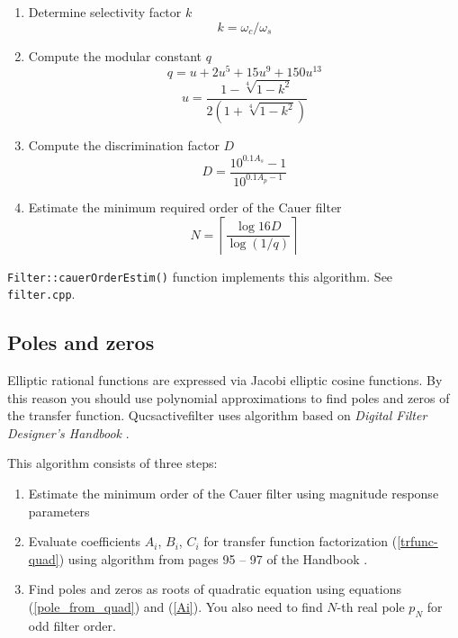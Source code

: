 \begin{enumerate}
 \item Determine selectivity factor $k$
 \begin{equation}
  k = \omega_c/\omega_s \label{k_cauer}
 \end{equation}
 \item Compute the modular constant $q$
 \begin{equation}
  q = u +2u^5+15u^9+150u^{13} \label{q_cauer}
 \end{equation}
 \begin{equation}
  u = \frac{1-\sqrt[4]{1-k^2}}{2(1+\sqrt[4]{1-k^2})}
 \end{equation}
\item Compute the discrimination factor $D$
\begin{equation}
 D = \frac{10^{0.1A_s}-1}{10^{0.1A_p-1}}
\end{equation}
\item Estimate the minimum required order of the Cauer filter
\begin{equation}
 N = \left\lceil\frac{\log 16D}{\log(1/q)}\right\rceil \label{cauer-order}
\end{equation}

\end{enumerate}

\verb|Filter::cauerOrderEstim()| function implements this algorithm. See
\verb|filter.cpp|.

\subsection{Poles and zeros}

Elliptic rational functions are expressed via Jacobi elliptic cosine functions.
By this reason you should use polynomial approximations to find poles and zeros
of the transfer function. Qucsactivefilter uses algorithm based on 
\emph{Digital Filter Designer's Handbook} \cite{dfd_handbook}.

This algorithm consists of three steps:
\begin{enumerate}
 \item Estimate the minimum order of the Cauer filter using magnitude
response parameters
 \item Evaluate coefficients $A_i$, $B_i$, $C_i$ for transfer function
factorization (\ref{trfunc-quad}) using algorithm from pages 95
-- 97 of the Handbook \cite{dfd_handbook}.
 \item Find poles and zeros as roots of quadratic equation using equations
(\ref{pole_from_quad}) and (\ref{Ai}). You also need to find $N$-th real pole
$p_N$ for odd filter order.
\end{enumerate}

